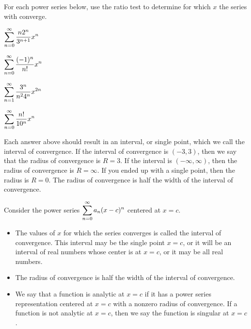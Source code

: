 \begin{problem}
For each power series below, use the ratio test to determine for which $x$ the series with converge.
\begin{enumerate}
\begin{multicols}{4}
 \item $\displaystyle\sum_{n=0}^\infty \frac{n2^n}{3^{n+1}}x^n$
 \item $\displaystyle\sum_{n=0}^\infty \frac{(-1)^n}{n!}x^n$
 \item $\displaystyle\sum_{n=1}^\infty \frac{3^{n}}{n^2 4^{n}}x^{2n}$
 \item $\displaystyle\sum_{n=0}^\infty \frac{n!}{10^n}x^n$
\end{multicols}
\end{enumerate}
\end{problem}

Each answer above should result in an interval, or single point, which we call the interval of convergence.  If the interval of convergence is $(-3,3)$, then we say that the radius of convergence is $R=3$.  If the interval is $(-\infty,\infty)$, then the radius of convergence is $R=\infty$. If you ended up with a single point, then the radius is $R=0$. The radius of convergence is half the width of the interval of convergence. 

\begin{definition}
 Consider the power series $\displaystyle\sum_{n=0}^\infty a_n (x-c)^n$ centered at $x=c$.
\begin{itemize}
 \item The values of $x$ for which the series converges is called the interval of convergence. This interval may be the single point $x=c$, or it will be an interval of real numbers whose center is at $x=c$, or it may be all real numbers.
 \item The radius of convergence is half the width of the interval of convergence. 
 \item We say that a function is analytic at $x=c$ if it has a power series representation centered at $x=c$ with a nonzero radius of convergence. If a function is not analytic at $x=c$, then we say the function is singular at $x=c$.  
\end{itemize}
\end{definition}


